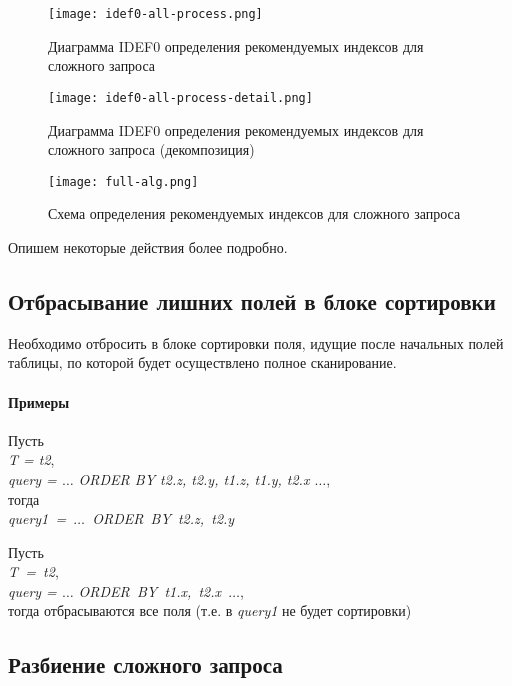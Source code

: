 \begin{figure}[h!]
  \centering
  \texttt{[image: idef0-all-process.png]}
  \caption{Диаграмма IDEF0 определения рекомендуемых индексов для сложного запроса}
  \label{img:idef0-all-process}
\end{figure}

\begin{figure}[h!]
  \centering
  \texttt{[image: idef0-all-process-detail.png]}
  \caption{Диаграмма IDEF0 определения рекомендуемых индексов для сложного запроса (декомпозиция)}
  \label{img:idef0-all-process-detail}
\end{figure}

\begin{figure}[h!]
  \centering
  \texttt{[image: full-alg.png]}
  \caption{Схема определения рекомендуемых индексов для сложного запроса}
  \label{img:full-alg}
\end{figure}

\indent
Опишем некоторые действия более подробно.





\subsection{Отбрасывание лишних полей в блоке сортировки}

Необходимо отбросить в блоке сортировки поля, идущие после начальных полей таблицы, по которой будет осуществлено полное сканирование.

\paragraph{Примеры}

Пусть\\
\textit{T = t2},\\
\textit{query = $\ldots$ ORDER BY t2.z, t2.y, t1.z, t1.y, t2.x $\ldots$},\\
тогда \\
\textit{query1 = $\ldots$ ORDER BY t2.z, t2.y}

Пусть \\
\textit{T = t2},\\
\textit{query = $\ldots$ ORDER BY t1.x, t2.x $\ldots$},\\
тогда отбрасываются все поля (т.е. в \textit{query1} не будет сортировки)


\subsection{Разбиение сложного запроса}

